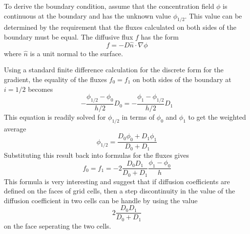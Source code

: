\documentclass[12pt]{article}
\begin{document}
To derive the boundary condition, assume that the concentration field $\phi$ is
continuous at the boundary and has the unknown value $\phi_{1/2}$. This value
can be determined by the requirement that the fluxes calculated on both sides of
the boundary must be equal. The diffusive flux $f$ has the form
\[
f =-D\hat{n}\cdot\nabla\phi
\]
where $\hat{n}$ is a unit normal to the surface.

Using a standard finite difference calculation for the discrete form for the
gradient, the equality of the fluxes $f_0=f_1$ on both sides of the boundary at $i=1/2$
becomes
\[
-\frac{\phi_{1/2}-\phi_0}{h/2}D_0 = -\frac{\phi_{1}-\phi_{1/2}}{h/2}D_1
\]
This equation is readily solved for $\phi_{1/2}$ in terms of $\phi_0$ and
$\phi_1$ to get the weighted average
\[
\phi_{1/2} = \frac{D_0\phi_0+D_1\phi_1}{D_0+D_1}
\]
Substituting this result back into formulas for the fluxes gives
\[
f_0=f_1=-2\frac{D_0 D_1}{D_0+D_1}\frac{\phi_1-\phi_0}{h}
\]
This formula is very interesting and suggest that if diffusion coefficients are
defined on the faces of grid cells, then a step discontinuity in the value of
the diffusion coefficient in two cells can be handle by using the value
\[
2\frac{D_0 D_1}{D_0+D_1}
\]
on the face seperating the two cells.
\end{document}
